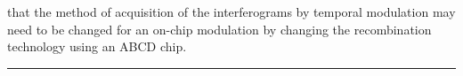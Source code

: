 that the method of acquisition of the interferograms by temporal modulation may need to be changed for an on-chip modulation by changing the recombination technology using an ABCD chip.

\vspace{0.2cm}
 \keywordnamesen

\noindent\rule[2pt]{\textwidth}{0.5pt}


